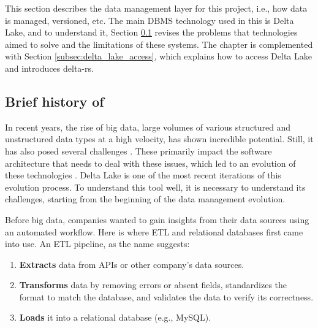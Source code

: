 This section describes the data management layer for this project, i.e., how data is managed, versioned, etc. The main \gls{DBMS} technology used in this is Delta Lake, and to understand it, Section \ref{subsec:history_DBMS} revises the problems that technologies aimed to solve and the limitations of these systems. The chapter is complemented with Section \ref{subsec:delta_lake_access}, which explains how to access Delta Lake and introduces delta-rs.

\subsection{Brief history of }
\label{subsec:history_DBMS}

In recent years, the rise of big data, large volumes of various structured and unstructured data types at a high velocity, has shown incredible potential. Still, it has also posed several challenges \cite{penceWhatBigData2014}. These primarily impact the software architecture that needs to deal with these issues, which led to an evolution of these technologies \cite{gortonDistributionDataDeployment2015}. Delta Lake \cite{armbrustDeltaLakeHighperformance2020} is one of the most recent iterations of this evolution process. To understand this tool well, it is necessary to understand its challenges, starting from the beginning of the data management evolution.

Before big data, companies wanted to gain insights from their data sources using an automated workflow. Here is where \gls{ETL} and relational databases first came into use. An \gls{ETL} pipeline, as the name suggests:
\begin{enumerate}
    \item \textbf{Extracts} data from \glspl{API} or other company's data sources.
    \item \textbf{Transforms} data by removing errors or absent fields, standardizes the format to match the database, and validates the data to verify its correctness.
    \item \textbf{Loads} it into a relational database (e.g., MySQL).
\end{enumerate} 

